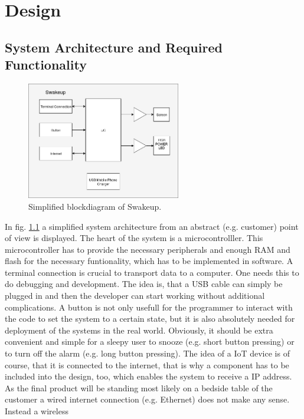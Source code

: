 \chapter{Design}
\label{chap:design}
\section{System Architecture and Required Functionality}
\label{sec:system_arch_and_req}
\begin{figure}[H]
	\centering
	\label{fig:block_simp}
	\includegraphics[width=0.6\textwidth]{../block/block_simplified.png}
	\caption{Simplified blockdiagram of Swakeup.}
\end{figure}
In fig. \ref{fig:block_simp} a simplified system architecture from an abstract
(e.g. customer) point of view is displayed. The heart of the system is a
microcontrolller. This microcontroller has to provide the necessary peripherals
and enough RAM and flash for the necessary funtionality, which has to be
implemented in software.  \newpar A terminal connection is crucial to transport
data to a computer. One needs this to do debugging and development. The idea is,
that a USB cable can simply be plugged in and then the developer can start
working without additional complications.  \newpar A button is not only usefull
for the programmer to interact with the code to set the system to a certain
state, but it is also absolutely needed for deployment of the systems in the
real world.  Obviously, it should be extra convenient and simple for a sleepy
user to snooze (e.g. short button pressing) or to turn off the alarm (e.g. long
button pressing).  \newpar The idea of a IoT device is of course, that it is
connected to the internet, that is why a component has to be included into the
design, too, which enables the system to receive a IP address. As the final
product will be standing most likely on a bedside table of the customer a wired
internet connection (e.g. Ethernet) does not make any sense. Instead a wireless
